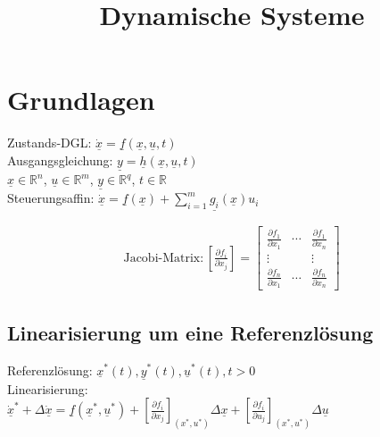 \documentclass[german]{latex4ei/latex4ei_sheet}
\title{Dynamische Systeme}
\begin{document}
\ifdefined\GitRevision{}\fi

\maketitle

\section{Grundlagen}
Zustands-DGL: $\underline{\dot{x}} =  \underline{f}\left( \underline{x}, \underline{u}, t \right) $ \\
Ausgangsgleichung: $\underline{y} = \underline{h} \left( \underline{x}, \underline{u}, t \right)$ \\
$\underline{x} \in \mathbb{R}^n$, $\underline{u} \in \mathbb{R}^m$, $\underline{y} \in \mathbb{R}^q$, $t \in \mathbb{R}$\\

Steuerungsaffin: $\underline{\dot{x}} = \underline{f}(\underline{x}) + \sum_{i=1}^{m} \underline{g_i}(\underline{x}) u_i$

\begin{align*}
\text{Jacobi-Matrix:} \,
\left[ \frac{\partial f_i}{\partial x_j} \right] =
\begin{bmatrix}
  \frac{\partial f_1}{\partial x_1} &   \cdots  &   \frac{\partial f_1}{\partial x_n} \\
  \vdots                            &           &   \vdots \\
  \frac{\partial f_n}{\partial x_1} &   \cdots  &   \frac{\partial f_n}{\partial x_n}
\end{bmatrix}
\end{align*}

\subsection{Linearisierung um eine Referenzlösung}

Referenzlösung: $\underline{x}^*(t), \underline{y}^*(t), \underline{u}^*(t), t > 0$ \\

Linearisierung: \\
$\underline{\dot{x}}^* + \Delta\underline{\dot{x}} = \underline{f}\left( \underline{x}^*, \underline{u}^* \right) +
\left[ \frac{\partial f_i}{\partial x_j} \right]_{(x^*, u^*)} \Delta\underline{x} +
\left[ \frac{\partial f_i}{\partial u_j} \right]_{(x^*, u^*)} \Delta\underline{u}
$
\end{document}
